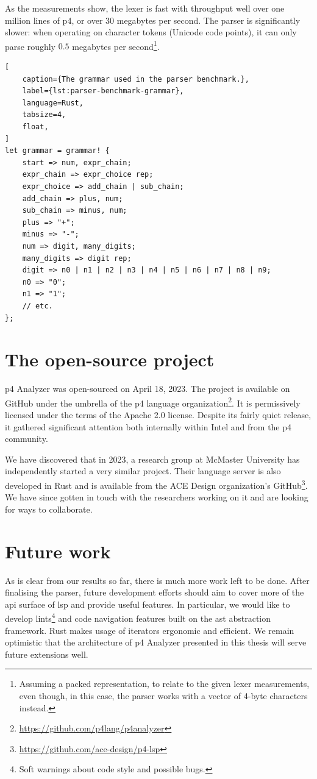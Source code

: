 As the measurements show, the lexer is fast with throughput well over one
million lines of \acrshort{p4}, or over \(30\) megabytes per second. The parser
is significantly slower: when operating on character tokens (Unicode code
points), it can only parse roughly \(0.5\) megabytes per
second\footnote{Assuming a packed representation, to relate to the given lexer
measurements, even though, in this case, the parser works with a vector of
4-byte characters instead.}.

\begin{lstlisting}[
	caption={The grammar used in the parser benchmark.},
	label={lst:parser-benchmark-grammar},
	language=Rust,
	tabsize=4,
	float,
]
let grammar = grammar! {
	start => num, expr_chain;
	expr_chain => expr_choice rep;
	expr_choice => add_chain | sub_chain;
	add_chain => plus, num;
	sub_chain => minus, num;
	plus => "+";
	minus => "-";
	num => digit, many_digits;
	many_digits => digit rep;
	digit => n0 | n1 | n2 | n3 | n4 | n5 | n6 | n7 | n8 | n9;
	n0 => "0";
	n1 => "1";
	// etc.
};
\end{lstlisting}

\section{The open-source project}

\acrshort{p4} Analyzer was open-sourced on April 18, 2023. The project is
available on GitHub under the umbrella of the \acrshort{p4} language
organization\footnote{\url{https://github.com/p4lang/p4analyzer}}. It is
permissively licensed under the terms of the Apache 2.0 license. Despite its
fairly quiet release, it gathered significant attention both internally within
Intel and from the \acrshort{p4} community.

We have discovered that in 2023, a research group at McMaster University has
independently started a very similar project. Their \pfs language server is also
developed in Rust and is available from the ACE Design organization's
GitHub\footnote{\url{https://github.com/ace-design/p4-lsp}}. We have since
gotten in touch with the researchers working on it and are looking for ways to
collaborate.

\section{Future work}

As is clear from our results so far, there is much more work left to be done.
After finalising the parser, future development efforts should aim to cover more
of the \acrshort{api} surface of \acrshort{lsp} and provide useful features. In
particular, we would like to develop lints\footnote{Soft warnings about code
style and possible bugs.} and code navigation features built on the
\acrshort{ast} abstraction framework. Rust makes usage of iterators ergonomic
and efficient. We remain optimistic that the architecture of \acrshort{p4}
Analyzer presented in this thesis will serve future extensions well.
